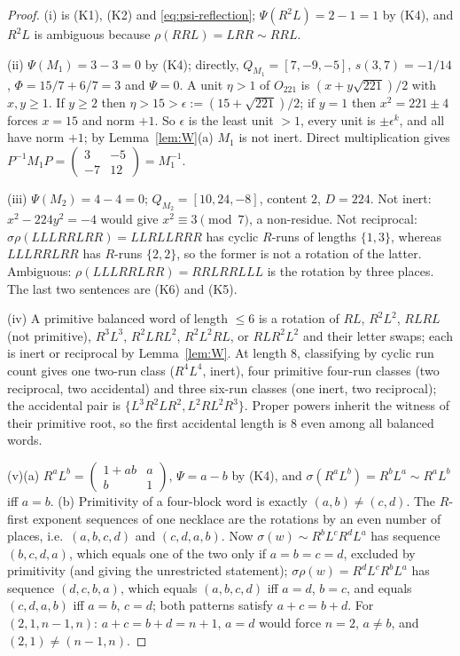 \documentclass[11pt]{article}
\theoremstyle{definition}
\begin{document}
\begin{proof}
(i) is (K1), (K2) and \eqref{eq:psi-reflection}; $\Psi(R^2L)=2-1=1$ by
(K4), and $R^2L$ is ambiguous because $\rho(RRL)=LRR\sim RRL$.

(ii) $\Psi(M_1)=3-3=0$ by (K4); directly, $Q_{M_1}=[7,-9,-5]$,
$s(3,7)=-1/14$, $\Phi=15/7+6/7=3$ and $\Psi=0$.  A unit $\eta>1$ of
$O_{221}$ is $(x+y\sqrt{221})/2$ with $x,y\geq1$.  If $y\geq2$ then
$\eta>15>\epsilon:=(15+\sqrt{221})/2$; if $y=1$ then $x^2=221\pm4$
forces $x=15$ and norm $+1$.  So $\epsilon$ is the least unit $>1$,
every unit is $\pm\epsilon^k$, and all have norm $+1$; by
Lemma~\ref{lem:W}(a) $M_1$ is not inert.  Direct multiplication gives
$P^{-1}M_1P=\begin{pmatrix}3&-5\\-7&12\end{pmatrix}=M_1^{-1}$.

(iii) $\Psi(M_2)=4-4=0$; $Q_{M_2}=[10,24,-8]$, content $2$, $D=224$.
Not inert: $x^2-224y^2=-4$ would give $x^2\equiv3\pmod7$, a
non-residue.  Not reciprocal: $\sigma\rho(LLLRRLRR)=LLRLLRRR$ has cyclic
$R$-runs of lengths $\{1,3\}$, whereas $LLLRRLRR$ has $R$-runs $\{2,2\}$,
so the former is not a rotation of the latter.
Ambiguous: $\rho(LLLRRLRR)=RRLRRLLL$ is the rotation by three places.
The last two sentences are (K6) and (K5).

(iv) A primitive balanced word of length $\leq6$ is a rotation of
$RL$, $R^2L^2$, $RLRL$ (not primitive), $R^3L^3$, $R^2LRL^2$, $R^2L^2RL$,
or $RLR^2L^2$ and their letter swaps; each is inert or reciprocal by
Lemma~\ref{lem:W}.  At length $8$, classifying by cyclic run count
gives one two-run class ($R^4L^4$, inert), four primitive four-run
classes (two reciprocal, two accidental) and three six-run classes (one
inert, two reciprocal); the accidental pair is $\{L^3R^2LR^2,L^2RL^2R^3\}$.
Proper powers inherit the witness of their primitive root, so the first
accidental length is $8$ even among all balanced words.

(v)(a) $R^aL^b=\begin{pmatrix}1+ab&a\\b&1\end{pmatrix}$, $\Psi=a-b$ by
(K4), and $\sigma(R^aL^b)=R^bL^a\sim R^aL^b$ iff $a=b$.
(b) Primitivity of a four-block word is exactly $(a,b)\neq(c,d)$.  The
$R$-first exponent sequences of one necklace are the rotations by an
even number of places, i.e.\ $(a,b,c,d)$ and $(c,d,a,b)$.  Now
$\sigma(w)\sim R^bL^cR^dL^a$ has sequence $(b,c,d,a)$, which equals one of
the two only if $a=b=c=d$, excluded by primitivity (and giving the
unrestricted statement); $\sigma\rho(w)=R^dL^cR^bL^a$ has sequence
$(d,c,b,a)$, which equals $(a,b,c,d)$ iff $a=d$, $b=c$, and equals
$(c,d,a,b)$ iff $a=b$, $c=d$; both patterns satisfy $a+c=b+d$.  For
$(2,1,n-1,n)$: $a+c=b+d=n+1$, $a=d$ would force $n=2$, $a\neq b$, and
$(2,1)\neq(n-1,n)$.


\end{proof}
\end{document}
